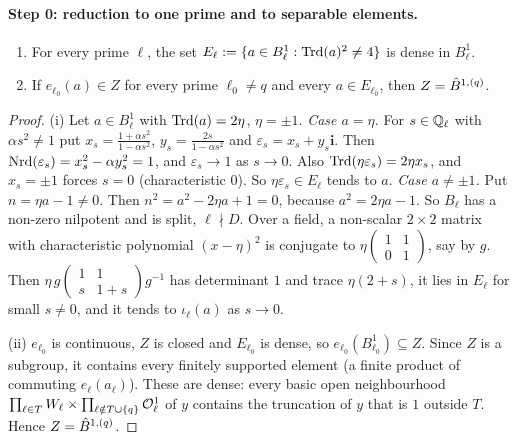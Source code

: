 \paragraph{Step 0: reduction to one prime and to separable elements.}

\begin{lemma}[reduction]\label{lem:s02-sa-reduce}
\begin{enumerate}[label=(\roman*)]
\item For every prime $\ell$, the set $E_\ell:=\{a\in B^1_\ell:\mathrm{Trd}(a)^2\ne4\}$ is dense in $B^1_\ell$.
\item If $e_{\ell_0}(a)\in Z$ for every prime $\ell_0\ne q$ and every $a\in E_{\ell_0}$, then $Z=\hat{B}^{1,(q)}$.
\end{enumerate}
\stproved{}
\end{lemma}

\begin{proof}
(i) Let $a\in B^1_\ell$ with $\mathrm{Trd}(a)=2\eta$, $\eta=\pm1$. \emph{Case $a=\eta$.} For $s\in\mathbb{Q}_\ell$ with $\alpha s^2\ne1$ put
$x_s=\frac{1+\alpha s^2}{1-\alpha s^2}$, $y_s=\frac{2s}{1-\alpha s^2}$ and $\varepsilon_s=x_s+y_s\mathbf i$. Then
$\mathrm{Nrd}(\varepsilon_s)=x_s^2-\alpha y_s^2=1$, and $\varepsilon_s\to1$ as $s\to0$. Also $\mathrm{Trd}(\eta\varepsilon_s)=2\eta x_s$, and
$x_s=\pm1$ forces $s=0$ (characteristic $0$). So $\eta\varepsilon_s\in E_\ell$ tends to $a$.
\emph{Case $a\ne\pm1$.} Put $n=\eta a-1\ne0$. Then $n^2=a^2-2\eta a+1=0$, because $a^2=2\eta a-1$. So $B_\ell$ has a non-zero
nilpotent and is split, $\ell\nmid D$. Over a field, a non-scalar $2\times2$ matrix with characteristic polynomial $(x-\eta)^2$
is conjugate to $\eta\left(\begin{smallmatrix}1&1\\0&1\end{smallmatrix}\right)$, say by $g$. Then
$\eta\,g\left(\begin{smallmatrix}1&1\\ s&1+s\end{smallmatrix}\right)g^{-1}$ has determinant $1$ and trace $\eta(2+s)$, it lies in
$E_\ell$ for small $s\ne0$, and it tends to $\iota_\ell(a)$ as $s\to0$.

(ii) $e_{\ell_0}$ is continuous, $Z$ is closed and $E_{\ell_0}$ is dense, so $e_{\ell_0}(B^1_{\ell_0})\subseteq Z$. Since $Z$ is a
subgroup, it contains every finitely supported element (a finite product of commuting $e_\ell(a_\ell)$). These are dense:
every basic open neighbourhood $\prod_{\ell\in T}W_\ell\times\prod_{\ell\notin T\cup\{q\}}\mathcal{O}^1_\ell$ of $y$ contains the
truncation of $y$ that is $1$ outside $T$. Hence $Z=\hat{B}^{1,(q)}$.
\end{proof}

